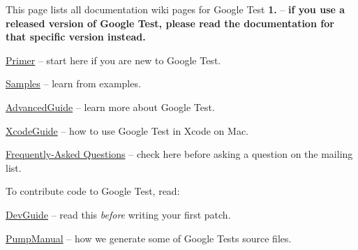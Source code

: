 This page lists all documentation wiki pages for Google Test {\bfseries 1.} -- {\bfseries if you use a released version of Google Test, please read the documentation for that specific version instead.}


\begin{DoxyItemize}
\item \hyperlink{V1__6__Primer_8md}{Primer} -- start here if you are new to Google Test.
\item \hyperlink{V1__6__Samples_8md}{Samples} -- learn from examples.
\item \hyperlink{V1__6__AdvancedGuide_8md}{Advanced\+Guide} -- learn more about Google Test.
\item \hyperlink{V1__6__XcodeGuide_8md}{Xcode\+Guide} -- how to use Google Test in Xcode on Mac.
\item \hyperlink{V1__6__FAQ_8md}{Frequently-\/\+Asked Questions} -- check here before asking a question on the mailing list.
\end{DoxyItemize}

To contribute code to Google Test, read\+:


\begin{DoxyItemize}
\item \hyperlink{googletest_2docs_2DevGuide_8md}{Dev\+Guide} -- read this {\itshape before} writing your first patch.
\item \hyperlink{V1__6__PumpManual_8md}{Pump\+Manual} -- how we generate some of Google Test\textquotesingle{}s source files. 
\end{DoxyItemize}